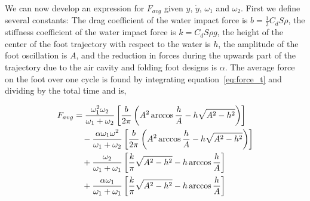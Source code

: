 We can now develop an expression for $F_{avg}$ given $y$, $\dot{y}$, $\omega_1$ and $\omega_2$. First we define several constants: The drag coefficient of the water impact force is $b = \frac{1}{2} C_d S \rho$, the stiffness coefficient of the water impact force is $k = C_d S \rho g$, the height of the center of the foot trajectory with respect to the water is $h$, the amplitude of the foot oscillation is $A$, and the reduction in forces during the upwards part of the trajectory due to the air cavity and folding foot designs is $\alpha$. The average force on the foot over one cycle is found by integrating equation~\ref{eq:force_t} and dividing by the total time and is,

\begin{align}
    F_{avg} &= \frac{\omega_1^2 \omega_2}{\omega_1 + \omega_2} 
                \left[ \frac{b}{2 \pi} \left( A^2 \arccos \frac{h}{A} - h \sqrt{A^2 - h^2} \right) \right] \notag \\ 
            &\quad - \frac{\alpha \omega_1 \omega^2}{\omega_1 + \omega_2} 
                \left[ \frac{b}{2 \pi} \left( A^2 \arccos \frac{h}{A} - h \sqrt{A^2 - h^2} \right) \right] \notag \\
            &\quad + \frac{\omega_2}{\omega_1 + \omega_1} 
                \left[ \frac{k}{\pi} \sqrt{A^2 - h^2} - h \arccos \frac{h}{A} \right] \notag \\
            &\quad + \frac{\alpha \omega_1}{\omega_1 + \omega_1} 
                \left[ \frac{k}{\pi} \sqrt{A^2 - h^2} - h \arccos \frac{h}{A} \right] \label{eq:eom_avg}
\end{align}

